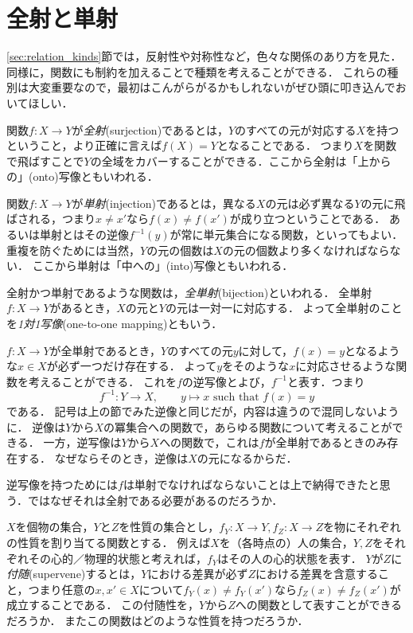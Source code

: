 \documentclass[11pt,a4paper]{jsarticle} %
\begin{document}
\section{全射と単射}
\ref{sec:relation_kinds}節では，反射性や対称性など，色々な関係のあり方を見た．
同様に，関数にも制約を加えることで種類を考えることができる．
これらの種別は大変重要なので，最初はこんがらがるかもしれないがぜひ頭に叩き込んでおいてほしい．

関数$f:X \to Y$が\emph{全射}(surjection)であるとは，$Y$のすべての元が対応する$X$を持つということ，より正確に言えば$f(X)=Y$となることである．
つまり$X$を関数で飛ばすことで$Y$の全域をカバーすることができる．ここから全射は「上からの」(onto)写像ともいわれる．

関数$f:X \to Y$が\emph{単射}(injection)であるとは，異なる$X$の元は必ず異なる$Y$の元に飛ばされる，つまり$x \neq x'$なら$f(x) \neq f(x')$が成り立つということである．
あるいは単射とはその逆像$f^{-1}(y)$が常に単元集合になる関数，といってもよい．
重複を防ぐためには当然，$Y$の元の個数は$X$の元の個数より多くなければならない．
ここから単射は「中への」(into)写像ともいわれる．

全射かつ単射であるような関数は，\emph{全単射}(bijection)といわれる．
全単射$f:X \to Y$があるとき，$X$の元と$Y$の元は一対一に対応する．
よって全単射のことを\emph{1対1写像}(one-to-one mapping)ともいう．

$f:X \to Y$が全単射であるとき，$Y$のすべての元$y$に対して，$f(x)=y$となるような$x \in X$が必ず一つだけ存在する．
よって$y$をそのような$x$に対応させるような関数を考えることができる．
これを$f$の逆写像とよび，$f^{-1}$と表す．つまり
\[
 f^{-1}:Y \to X, \hspace{2em} y \mapsto x \text{ such that } f(x)=y
\]
である．
記号は上の節でみた逆像と同じだが，内容は違うので混同しないように．
逆像は$Y$から$X$の冪集合への関数で，あらゆる関数について考えることができる．
一方，逆写像は$Y$から$X$への関数で，これは$f$が全単射であるときのみ存在する．
なぜならそのとき，逆像は$X$の元になるからだ．

\begin{exercise}
 逆写像を持つためには$f$は単射でなければならないことは上で納得できたと思う．ではなぜそれは全射である必要があるのだろうか．
\end{exercise}


\begin{example}
\label{eg:supervenience}
 $X$を個物の集合，$Y$と$Z$を性質の集合とし，$f_Y:X \to Y, f_Z:X \to Z$を物にそれぞれの性質を割り当てる関数とする．
例えば$X$を（各時点の）人の集合，$Y, Z$をそれぞれその心的／物理的状態と考えれば，$f_Y$はその人の心的状態を表す．
$Y$が$Z$に\emph{付随}(supervene)するとは，$Y$における差異が必ず$Z$における差異を含意すること，つまり任意の$x, x' \in X$について$f_Y(x) \neq f_Y(x')$なら$f_Z(x) \neq f_Z(x')$が成立することである．
この付随性を，$Y$から$Z$への関数として表すことができるだろうか．
またこの関数はどのような性質を持つだろうか．
\end{example}
\end{document}
